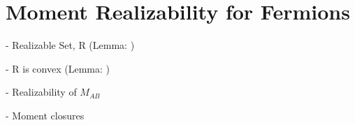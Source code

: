 \section{Moment Realizability for Fermions}

  - Realizable Set, R (Lemma: )

  - R is convex (Lemma: )

  - Realizability of $M_{AB}$

  - Moment closures